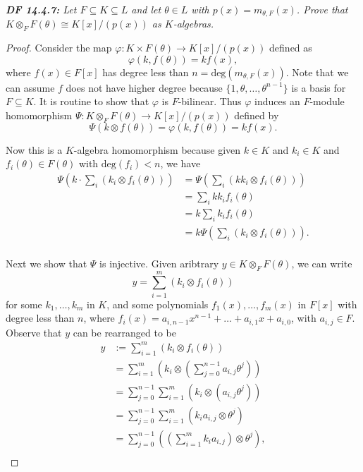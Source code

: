 \documentclass{article}
\begin{document}
\it \textbf{DF 14.4.7:} Let $F\subseteq K\subseteq L$ and let $\theta\in L$
  with $p(x)=m_{\theta,F}(x)$. Prove that $K\otimes_F F(\theta) \cong
  K[x]/(p(x))$ as $K$-algebras.

  \begin{proof}
    Consider the map $\varphi:K\times F(\theta) \rightarrow K[x]/(p(x))$
    defined as
    \[\varphi(k,f(\theta)) =kf(x),\]
    where $f(x)\in F[x]$ has degree less than
    $n=\text{deg}(m_{\theta,F}(x))$. Note that we can assume $f$ does not
    have higher degree because $\{1,\theta,\ldots,\theta^{n-1}\}$ is a
    basis for $F\subseteq K$. It is routine to show that $\varphi$ is
    $F$-bilinear. Thus $\varphi$ induces an $F$-module homomorphism
    $\Psi:K\otimes_F F(\theta) \rightarrow K[x]/(p(x))$ defined by
    \[\Psi(k\otimes f(\theta)) =\varphi(k,f(\theta)) =kf(x).\]

    Now this is a $K$-algebra homomorphism because given $k\in K$ and
    $k_i\in K$ and $f_i(\theta)\in F(\theta)$ with $\text{deg}(f_i)<n$, we
    have
    \begin{align*}
      \Psi\left( k\cdot \sum_i (k_i\otimes f_i(\theta)) \right)
        &=\Psi\left( \sum_i (kk_i\otimes f_i(\theta)) \right) \\
      &=\sum_i kk_if_i(\theta) \\
      &=k\sum_i k_if_i(\theta) \\
      &=k\Psi\left( \sum_i (k_i\otimes f_i(\theta)) \right). \\
    \end{align*}

    Next we show that $\Psi$ is injective. Given aribtrary $y\in K\otimes_F
    F(\theta)$, we can write
    \[y= \sum_{i=1}^m (k_i\otimes f_i(\theta))\]
    for some $k_1,\ldots,k_m$ in $K$, and some polynomials
    $f_1(x),\ldots,f_m(x)$ in $F[x]$ with degree less than $n$, where
    $f_i(x)=a_{i,n-1}x^{n-1}+\ldots+a_{i,1}x+a_{i,0}$, with $a_{i,j}\in F$.
    Observe that $y$ can be rearranged to be
    \begin{align*}
      y &:=\sum_{i=1}^m (k_i\otimes f_i(\theta))\\
      &=\sum_{i=1}^m \left(k_i \otimes \left(\sum_{j=0}^{n-1}
        a_{i,j}\theta^j\right) \right)\\
      &=\sum_{j=0}^{n-1} \sum_{i=1}^m \left(k_i \otimes \left(
        a_{i,j}\theta^j\right) \right)\\
      &=\sum_{j=0}^{n-1} \sum_{i=1}^m (k_ia_{i,j} \otimes \theta^j)\\
      &=\sum_{j=0}^{n-1} \left(\left(\sum_{i=1}^m k_ia_{i,j}\right)
        \otimes \theta^j \right),\\
    \end{align*}


\end{proof}
\end{document}
